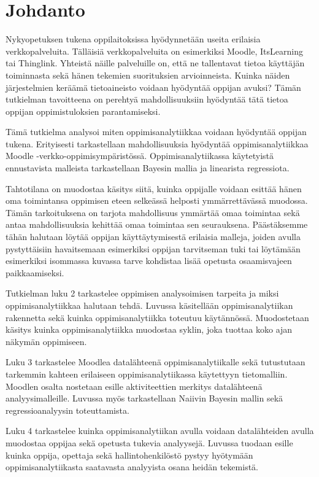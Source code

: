 \chapter{Johdanto\label{johdanto}}

Nykyopetuksen tukena oppilaitoksissa hyödynnetään useita erilaisia verkkopalveluita. Tälläisiä verkkopalveluita on esimerkiksi Moodle, ItsLearning tai Thinglink. Yhteistä näille palveluille on, että ne tallentavat tietoa käyttäjän toiminnasta sekä hänen tekemien suorituksien arvioinneista. Kuinka näiden järjestelmien keräämä tietoaineisto voidaan hyödyntää oppijan avuksi? Tämän tutkielman tavoitteena on perehtyä mahdollisuuksiin hyödyntää tätä tietoa oppijan oppimistuloksien parantamiseksi.

Tämä tutkielma analysoi miten oppimisanalytiikkaa voidaan hyödyntää oppijan tukena. Erityisesti tarkastellaan mahdollisuuksia hyödyntää oppimisanalytiikkaa Moodle -verkko-oppimisympäristössä. Oppimisanalytiikassa käytetyistä ennustavista malleista tarkastellaan Bayesin mallia ja linearista regressiota.

Tahtotilana on muodostaa käsitys siitä, kuinka oppijalle voidaan esittää hänen oma toimintansa oppimisen eteen selkeässä helposti ymmärrettävässä muodossa. Tämän tarkoituksena on tarjota mahdollisuus ymmärtää omaa toimintaa sekä antaa mahdollisuuksia kehittää omaa toimintaa sen seurauksena. Päästäksemme tähän halutaan löytää oppijan käyttäytymisestä erilaisia malleja, joiden avulla pystyttäisiin havaitsemaan esimerkiksi oppijan tarvitseman tuki tai löytämään esimerkiksi isommassa kuvassa tarve kohdistaa lisää opetusta osaamisvajeen paikkaamiseksi.

Tutkielman luku 2 tarkastelee oppimisen analysoimisen tarpeita ja miksi oppimisanalytiikkaa halutaan tehdä. Luvussa käsitellään oppimisanalytiikan rakennetta sekä kuinka oppimisanalytiikka toteutuu käytännössä. Muodostetaan käsitys kuinka oppimisanalytiikka muodostaa syklin, joka tuottaa koko ajan näkymän oppimiseen.

Luku 3 tarkastelee Moodlea datalähteenä oppimisanalytiikalle sekä tutustutaan tarkemmin kahteen erilaiseen oppimisanalytiikassa käytettyyn tietomalliin. Moodlen osalta nostetaan esille aktiviteettien merkitys datalähteenä analyysimalleille. Luvussa myös tarkastellaan Naiivin Bayesin mallin sekä regressioanalyysin toteuttamista.

Luku 4 tarkastelee kuinka oppimisanalytiikan avulla voidaan datalähteiden avulla muodostaa oppijaa sekä opetusta tukevia analyysejä. Luvussa tuodaan esille kuinka oppija, opettaja sekä hallintohenkilöstö pystyy hyötymään oppimisanalytiikasta saatavasta analyyista osana heidän tekemistä.

